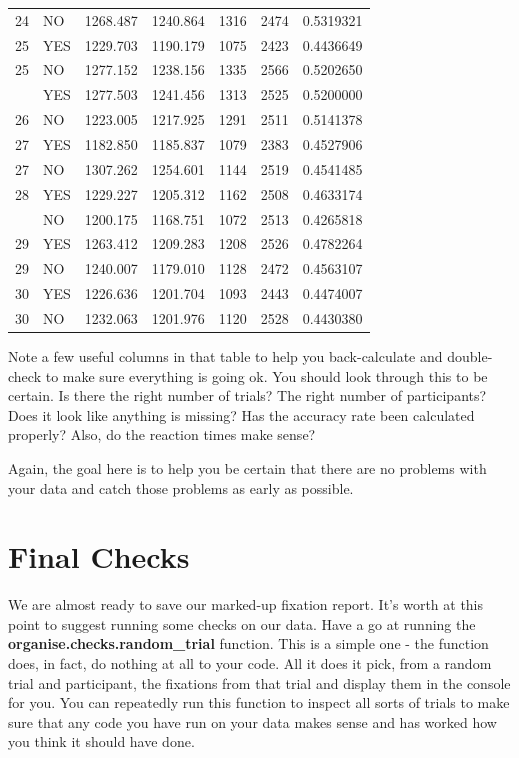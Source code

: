 \documentclass[]{book}
\begin{document}
\begin{table}[t]
\begin{tabular}{rlrrrrr}
24 & NO & 1268.487 & 1240.864 & 1316 & 2474 & 0.5319321\\
25 & YES & 1229.703 & 1190.179 & 1075 & 2423 & 0.4436649\\
25 & NO & 1277.152 & 1238.156 & 1335 & 2566 & 0.5202650\\
\addlinespace
26 & YES & 1277.503 & 1241.456 & 1313 & 2525 & 0.5200000\\
26 & NO & 1223.005 & 1217.925 & 1291 & 2511 & 0.5141378\\
27 & YES & 1182.850 & 1185.837 & 1079 & 2383 & 0.4527906\\
27 & NO & 1307.262 & 1254.601 & 1144 & 2519 & 0.4541485\\
28 & YES & 1229.227 & 1205.312 & 1162 & 2508 & 0.4633174\\
\addlinespace
28 & NO & 1200.175 & 1168.751 & 1072 & 2513 & 0.4265818\\
29 & YES & 1263.412 & 1209.283 & 1208 & 2526 & 0.4782264\\
29 & NO & 1240.007 & 1179.010 & 1128 & 2472 & 0.4563107\\
30 & YES & 1226.636 & 1201.704 & 1093 & 2443 & 0.4474007\\
30 & NO & 1232.063 & 1201.976 & 1120 & 2528 & 0.4430380\\
\bottomrule
\end{tabular}
\end{table}

Note a few useful columns in that table to help you back-calculate and double-check to make sure everything is going ok. You should look through this to be certain. Is there the right number of trials? The right number of participants? Does it look like anything is missing? Has the accuracy rate been calculated properly? Also, do the reaction times make sense?

Again, the goal here is to help you be certain that there are no problems with your data and catch those problems as early as possible.

\hypertarget{final-checks}{%
\section{Final Checks}\label{final-checks}}

We are almost ready to save our marked-up fixation report. It's worth at this point to suggest running some checks on our data. Have a go at running the \textbf{organise.checks.random\_trial} function. This is a simple one - the function does, in fact, do nothing at all to your code. All it does it pick, from a random trial and participant, the fixations from that trial and display them in the console for you. You can repeatedly run this function to inspect all sorts of trials to make sure that any code you have run on your data makes sense and has worked how you think it should have done.
\end{document}
